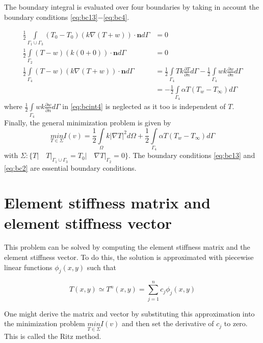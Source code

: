 \documentclass[10pt,a4paper]{article}
\begin{document}
The boundary integral is evaluated over four boundaries by taking in account the boundary conditions \eqref{eq:bc13}$-$\eqref{eq:bc4}. 

\begin{align}\label{eq:bcint13}
	\frac{1}{2}\underset{\Gamma_1\cup\Gamma_3}{\int}(T_0-T_0)(k\nabla(T+w))\cdot\textbf{\^{n}} d\Gamma &= 0\\
	\frac{1}{2}\underset{\Gamma_2}{\int}(T-w)(k(0+0))\cdot\textbf{\^{n}} d\Gamma & = 0\label{eq:bcint2}\\ 
	\frac{1}{2}\underset{\Gamma_4}{\int}(T-w)(k\nabla(T+w))\cdot\textbf{\^{n}} d\Gamma & = \frac{1}{2}\underset{\Gamma_4}{\int}Tk\frac{\partial T}{\partial n}d\Gamma - \frac{1}{2}\underset{\Gamma_4}{\int}wk\frac{\partial w}{\partial n}d\Gamma\nonumber\\
	&=-\frac{1}{2}\underset{\Gamma_4}{\int}\alpha T(T_w-T_{\infty})d\Gamma \label{eq:bcint4}
\end{align}
where $\frac{1}{2}\underset{\Gamma_4}{\int}wk\frac{\partial w}{\partial n}d\Gamma$ in \eqref{eq:bcint4} is neglected as it too is independent of $T$.\\

Finally, the general minimization problem is given by
\begin{equation}\label{eq:minf}
\underset{T\in\Sigma} {min}I(v) =\frac{1}{2}\underset{\Omega}{\int}k\lvert\nabla T \rvert ^{2}  d\Omega + \frac{1}{2}\underset{\Gamma_4}{\int}\alpha T(T_w-T_{\infty})d\Gamma 
\end{equation}
with $\Sigma: \{T\rvert\quad T\rvert_{\Gamma_1\cup\Gamma_3}=T_0\rvert\quad \nabla T\rvert_{\Gamma_2}=0\}$. The boundary conditions \eqref{eq:bc13} and \eqref{eq:bc2} are essential boundary conditions.

\section{Element stiffness matrix and element stiffness vector}
This problem can be solved by computing the element stiffness matrix and the element stiffness vector.
To do this, the solution is approximated with piecewise linear functions $\phi_j(x,y)$ such that

\begin{equation}\label{eq:app}
T(x,y) \simeq T^n (x,y) =\displaystyle\sum^n_{j=1} c_j \phi_j(x,y)
\end{equation}

One might derive the matrix and vector by substituting this approximation into the minimization problem $\underset{T\in\Sigma} {min}I(v) $ and then set the derivative of $c_j$ to zero. This is called the Ritz method.\\
\end{document}
